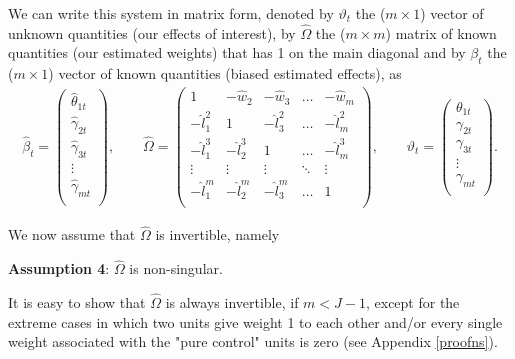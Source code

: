 We can write this system in  matrix form, denoted by $\vartheta_t$ the ($m \times 1$) vector of unknown quantities (our effects of interest), by $\widehat{\Omega}$ the ($m \times m$) matrix of known quantities (our estimated weights) that has 1 on the main diagonal and by $\beta_t$ the ($m \times 1$) vector of known quantities (biased estimated effects), as 
\begin{eqnarray}
\widehat{\beta}_t=
\begin{pmatrix}
\widehat{\theta}_{1t} \\
\widehat{\gamma}_{2t} \\
\widehat{\gamma}_{3t} \\
\vdots \\
\widehat{\gamma}_{mt}\\
\end{pmatrix}, \ \ \ \ \ \ \ \ \  
\widehat{\Omega}=
\begin{pmatrix}
1 & - \widehat{w}_{2} & - \widehat{w}_{3} & \dots & - \widehat{w}_{m} \\
- \widehat{l}_{1}^{2} & 1 & -\widehat{l}_{3}^{2} & \dots & -\widehat{l}_{m}^{2} \\
-\widehat{l}_{1}^{3} & -\widehat{l}_{2}^{3} & 1 & \dots &  -\widehat{l}_{m}^{3} \\
\vdots & \vdots & \vdots & \ddots & \vdots\\
-\widehat{l}_{1}^{m} & -\widehat{l}_{2}^{m} & -\widehat{l}_{3}^{m} & \dots & 1 \\
\end{pmatrix}, \ \ \ \ \ \ \ \ \  
\vartheta_t=
\begin{pmatrix}
\theta_{1t} \\
\gamma_{2t} \\
\gamma_{3t} \\
\vdots \\
\gamma_{mt}\\
\end{pmatrix}.\label{sye}
\end{eqnarray}


We now assume that $\widehat{\Omega}$ is invertible, namely

\bigskip
\begin{center}
\textbf{Assumption 4}: $\widehat{\Omega}$ is non-singular.
\end{center}
\bigskip

It is easy to show that $\widehat{\Omega}$ is always invertible, if $m< J-1$, except for the extreme cases in which two units give weight 1 to each other and/or every single weight associated with the "pure control" units is zero (see Appendix \ref{proofns}).

